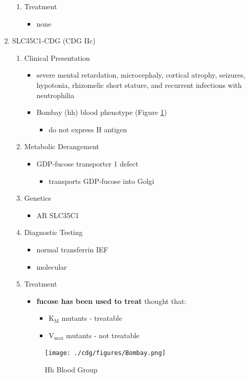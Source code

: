 \documentclass{scrartcl}
\begin{document}
\begin{enumerate}
\begin{enumerate}
\item Treatment
\label{sec:orgbb0f7d9}
\begin{itemize}
\item none
\end{itemize}
\end{enumerate}
\item SLC35C1-CDG (CDG IIc)
\label{sec:org1a54372}
\begin{enumerate}
\item Clinical Presentation
\label{sec:org428cc3b}
\begin{itemize}
\item severe mental retardation, microcephaly, cortical atrophy, seizures,
hypotonia, rhizomelic short stature, and recurrent infections with
neutrophilia
\item Bombay (hh) blood phenotype (Figure \ref{fig:org026404f})
\begin{itemize}
\item do not express H antigen
\end{itemize}
\end{itemize}
\item Metabolic Derangement
\label{sec:org48daeff}
\begin{itemize}
\item GDP-fucose transporter 1 defect
\begin{itemize}
\item transports GDP-fucose into Golgi
\end{itemize}
\end{itemize}
\item Genetics
\label{sec:org0d02b05}
\begin{itemize}
\item AR SLC35C1
\end{itemize}

\item Diagnostic Testing
\label{sec:org60077ec}
\begin{itemize}
\item normal transferrin IEF
\item molecular
\end{itemize}

\item Treatment
\label{sec:orgcab4df5}
\begin{itemize}
\item \textbf{fucose has been used to treat} thought that:
\begin{itemize}
\item K\(_{\text{M}}\) mutants - treatable
\item V\(_{\text{max}}\) mutants - not treatable
\end{itemize}
\end{itemize}

\begin{figure}[htbp]
\centering
\texttt{[image: ./cdg/figures/Bombay.png]}
\caption[Hh]{\label{fig:org026404f}
Hh Blood Group}
\end{figure}
\end{enumerate}
\end{enumerate}
\end{document}
